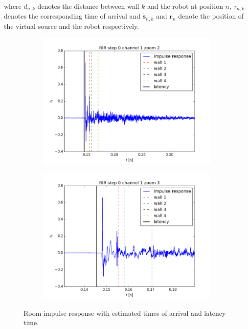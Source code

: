 where $d_{n,k}$ denotes the distance between wall $k$ and the robot at position $n$, $\tau_{n,k}$ denotes the corresponding time of arrival and $\tilde{\mathbf{s}}_{n,k}$ and $\mathbf{r}_{n}$ denote the position of the virtual source and the robot respectively. 

\begin{figure}[htb]
	\centering		
	\begin{subfigure}[b]{0.49\linewidth}
        \centering
		\includegraphics[width=\linewidth]{files/0_1_RIR_zoom2.png}
	\end{subfigure} 
	\begin{subfigure}[b]{0.49\linewidth}
        \centering
		\includegraphics[width=\linewidth]{files/0_1_RIR_zoom3.png}
	\end{subfigure}
	\caption{Room impulse response with estimated times of arrival and latency time.} 
	\label{fig:RIR_zooms}
\end{figure}

